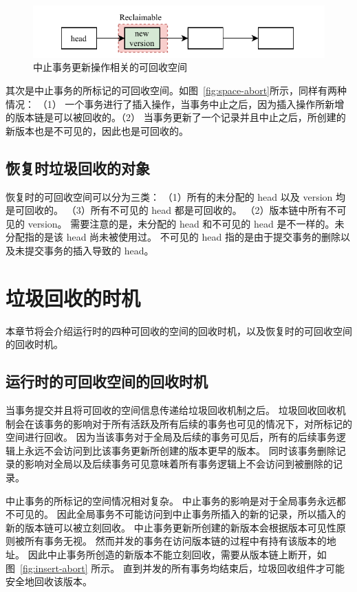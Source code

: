 \begin{figure}
    \centering
    \includegraphics[width=1\linewidth]{figures/gc-d.pdf}
    \caption{中止事务更新操作相关的可回收空间}
    \label{fig:space-abort2}
\end{figure}

其次是中止事务的所标记的可回收空间。如图~\ref{fig:space-abort}所示，同样有两种情况：
（1） 一个事务进行了插入操作，当事务中止之后，因为插入操作所新增的版本链是可以被回收的。（2） 当事务更新了一个记录并且中止之后，所创建的新版本也是不可见的，因此也是可回收的。

\subsection{恢复时垃圾回收的对象}

恢复时的可回收空间可以分为三类：
（1）所有的未分配的 head 以及 version 均是可回收的。
（3）所有不可见的 head 都是可回收的。
（2）版本链中所有不可见的 version。
需要注意的是，未分配的 head 和不可见的 head 是不一样的。未分配指的是该 head 尚未被使用过。
不可见的 head 指的是由于提交事务的删除以及未提交事务的插入导致的 head。


\section{垃圾回收的时机}
\label{sec:time}

本章节将会介绍运行时的四种可回收的空间的回收时机，以及恢复时的可回收空间的回收时机。

\subsection{运行时的可回收空间的回收时机}

当事务提交并且将可回收的空间信息传递给垃圾回收机制之后。
垃圾回收回收机制会在该事务的影响对于所有活跃及所有后续的事务也可见的情况下，对所标记的空间进行回收。
因为当该事务对于全局及后续的事务可见后，所有的后续事务逻辑上永远不会访问到比该事务更新所创建的版本更早的版本。
同时该事务删除记录的影响对全局以及后续事务可见意味着所有事务逻辑上不会访问到被删除的记录。

中止事务的所标记的空间情况相对复杂。
中止事务的影响是对于全局事务永远都不可见的。
因此全局事务不可能访问到中止事务所插入的新的记录，所以插入的新的版本链可以被立刻回收。
中止事务更新所创建的新版本会根据版本可见性原则被所有事务无视。
然而并发的事务在访问版本链的过程中有持有该版本的地址。
因此中止事务所创造的新版本不能立刻回收，需要从版本链上断开，如图~\ref{fig:insert-abort} 所示。
直到并发的所有事务均结束后，垃圾回收组件才可能安全地回收该版本。

